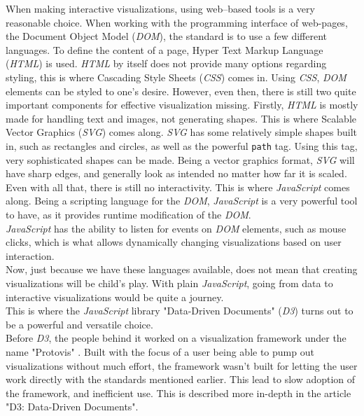 \documentclass[Report.tex]{subfiles}
\begin{document}
	
	When making interactive visualizations, using web--based tools is a very reasonable choice. When working with the programming interface of web-pages, the Document Object Model (\emph{DOM}), the standard is to use a few different languages. To define the content of a page, Hyper Text Markup Language (\emph{HTML}) is used. \emph{HTML} by itself does not provide many options regarding styling, this is where Cascading Style Sheets (\emph{CSS}) comes in. Using \emph{CSS}, \emph{DOM} elements can be styled to one's desire. However, even then, there is still two quite important components for effective visualization missing. Firstly, \emph{HTML} is mostly made for handling text and images, not generating shapes. This is where Scalable Vector Graphics (\emph{SVG}) comes along. \emph{SVG} has some relatively simple shapes built in, such as rectangles and circles, as well as the powerful \texttt{path} tag. Using this tag, very sophisticated shapes can be made. Being a vector graphics format, \emph{SVG} will have sharp edges, and generally look as intended no matter how far it is scaled.\\
	Even with all that, there is still no interactivity. This is where \emph{JavaScript} comes along. Being a scripting language for the \emph{DOM}, \emph{JavaScript} is a very powerful tool to have, as it provides runtime modification of the \emph{DOM}. \\\emph{JavaScript} has the ability to listen for events on \emph{DOM} elements, such as mouse clicks, which is what allows dynamically changing visualizations based on user interaction.\\
	Now, just because we have these languages available, does not mean that creating visualizations will be child's play. With plain \emph{JavaScript}, going from data to interactive visualizations would be quite a journey.
	\\
	This is where the \emph{JavaScript} library "Data-Driven Documents" (\emph{D3}) turns out to be a powerful and versatile choice.\\ 
	Before \emph{D3}, the people behind it worked on a visualization framework under the name "Protovis" \cite{Protovis}. Built with the focus of a user being able to pump out visualizations without much effort, the framework wasn't built for letting the user work directly with the standards mentioned earlier. This lead to slow adoption of the framework, and inefficient use. This is described more in-depth in the article "D3: Data-Driven Documents"\cite{D3}.\\
	
\end{document}
